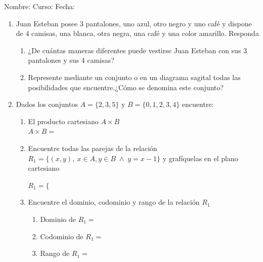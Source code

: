 \documentclass[letterpaper,fleqn]{article}
\newcommand{\LineaNombre}{%
\par
\vspace{\baselineskip}
Nombre:\hrulefill \; Curso: \underline{\hspace*{48pt}} \; Fecha: \underline{\hspace*{2.5cm}} \relax
\par}
\begin{document}
\LineaNombre
\begin{enumerate}
 \item Juan Esteban posee 3 pantalones, uno azul, otro negro y uno café y dispone de 4 camisas, una blanca, otra negra, una café y una color amarillo. Responda
 \begin{enumerate}
 \item ¿De cuántas maneras diferentes puede vestirse Juan Esteban con sus 3 pantalones y sus 4 camisas? \underline{\hspace{1in}}
 \item Represente mediante un conjunto o en un diagrama sagital todas las posibilidades que encuentre.¿Cómo se denomina este conjunto? \noanswer
\end{enumerate}
\item Dados los conjuntos $A=\{2,3,5\}$ y $B=\{0,1,2,3,4\}$ encuentre:
\begin{enumerate}
\item El producto cartesiano $A\times B$\\
$A \times B=$
\item Encuentre todas las parejas de la relación $R_{1}=\{(x,y), \: x \in A, y \in B \; \wedge \; y=x-1\}$ y grafíquelas en el plano cartesiano
\begin{center}

\end{center}
$R_{1}=\{$
\item Encuentre el dominio, codominio y rango de la relación $R_{1}$
\begin{enumerate}
\item Dominio de $R_{1}=$
\item Codominio de $R_{1}=$
\item Rango de $R_{1}=$
\end{enumerate}
\end{enumerate}

 \end{enumerate}
\end{document}
